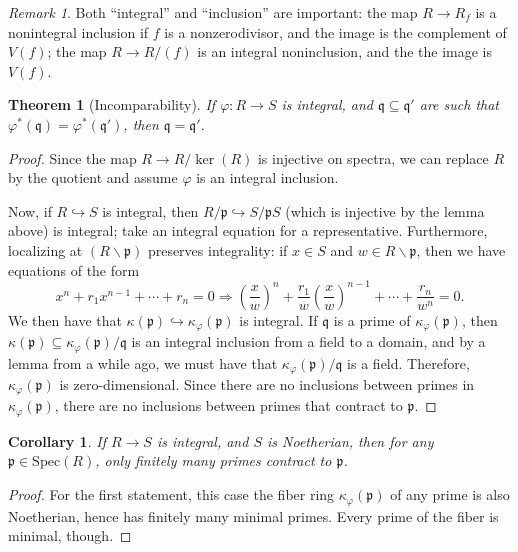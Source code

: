 \documentclass{amsart}[12pt]
\def\ker{\operatorname{ker}}
\newcommand{\p}{{\mathfrak p}}
\newcommand{\q}{{\mathfrak q}}
\numberwithin{equation}{section}
\theoremstyle{plain} %
\newtheorem{theorem}[equation]{Theorem}
\newtheorem{corollary}[equation]{Corollary}
\theoremstyle{definition}
\theoremstyle{remark}
\newtheorem{remark}[equation]{Remark}
\newcommand{\Spec}{\mathrm{Spec}}
\begin{document}
\begin{remark} Both ``integral'' and ``inclusion'' are important: the map $R\to R_f$ is a nonintegral inclusion if $f$ is a nonzerodivisor, and the image is the complement of $V(f)$; the map $R\to R/(f)$ is an integral noninclusion, and the the image is $V(f)$.
\end{remark}


\begin{theorem}[Incomparability]
If $\varphi: R \to S$ is integral, and $\q \subseteq \q'$ are such that $\varphi^*(\q)=\varphi^*(\q')$, then $\q=\q'$.
\end{theorem}
\begin{proof}
Since the map $R\to R/\ker(R)$ is injective on spectra, we can replace $R$ by the quotient and assume $\varphi$ is an integral inclusion.

Now, if $R\hookrightarrow S$ is integral, then $R/\p \hookrightarrow S/\p S$ (which is injective by the lemma above) is integral; take an integral equation for a representative. Furthermore, localizing at $(R\smallsetminus \p)$ preserves integrality: if $x\in S$ and $w\in R\smallsetminus \p$, then we have equations of the form
\[ x^n + r_1 x^{n-1} + \cdots + r_n = 0 \Longrightarrow (\frac{x}{w})^n + \frac{r_1}{w} (\frac{x}{w})^{n-1} + \cdots + \frac{r_n}{w^n}  =0.   \] 
We then have that $\kappa(\p)\hookrightarrow \kappa_{\varphi}(\p)$ is integral. If $\q$ is a prime of $\kappa_{\varphi}(\p)$, then $\kappa(\p)\subseteq \kappa_{\varphi}(\p) / \q$ is an integral inclusion from a field to a domain, and by a lemma from a while ago, we must have that $\kappa_{\varphi}(\p) / \q$ is a field. Therefore, $\kappa_{\varphi}(\p)$ is zero-dimensional. Since there are no inclusions between primes in $\kappa_{\varphi}(\p)$, there are no inclusions between primes that contract to $\p$.
\end{proof}



\begin{corollary}
If $R \to S$ is integral, and $S$ is Noetherian, then for any $\p\in \Spec(R)$, only finitely many primes contract to $\p$.
\end{corollary}

\begin{proof}
	For the first statement, this case the fiber ring $\kappa_{\varphi}(\p)$ of any prime is also Noetherian, hence has finitely many minimal primes. Every prime of the fiber is minimal, though.
\end{proof}
\end{document}
